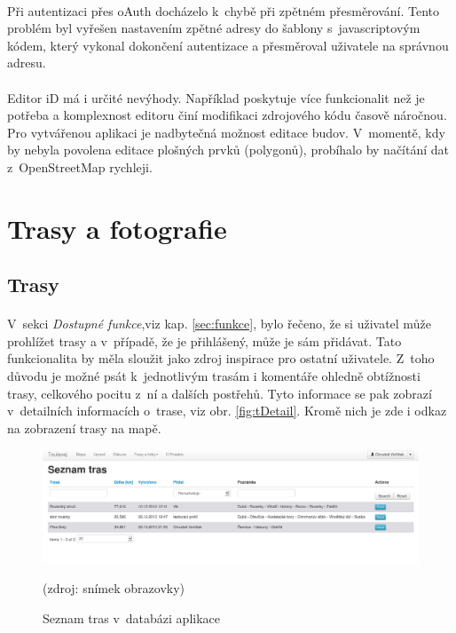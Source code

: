 \documentclass[11pt,a4paper,titlepage,oneside]{book}
\begin{document}
				\paragraph{} Při autentizaci přes oAuth docházelo k~chybě při zpětném přesměrování. Tento problém byl vyřešen nastavením zpětné adresy do šablony s~javascriptovým kódem, který vykonal dokončení autentizace a přesměroval uživatele na správnou adresu.

				\paragraph{} Editor iD má i určité nevýhody. Například poskytuje více funkcionalit než je potřeba a komplexnost editoru činí modifikaci zdrojového kódu časově náročnou. Pro vytvářenou aplikaci je nadbytečná možnost editace budov. V~momentě, kdy by nebyla povolena editace plošných prvků (polygonů), probíhalo by načítání dat z~OpenStreetMap rychleji. 



		\section{Trasy a fotografie}
			\subsection{Trasy}
			\paragraph{} V~sekci \textit{Dostupné funkce},viz kap. \ref{sec:funkce}, bylo řečeno, že si uživatel může prohlížet trasy a v~případě, že je přihlášený, může je sám přidávat. Tato funkcionalita by měla sloužit jako zdroj inspirace pro ostatní uživatele. Z~toho důvodu je možné psát k~jednotlivým trasám i komentáře ohledně obtížnosti trasy, celkového pocitu z~ní a dalších postřehů. Tyto informace se pak zobrazí v~detailních informacích o~trase, viz obr. \ref{fig:tDetail}. Kromě nich je zde i odkaz na zobrazení trasy na mapě.
		\begin{figure}[!h]
			\begin{center}
				\includegraphics[width=12cm]{obrazky/toulavej/trackDefault.png}
				\caption{Seznam tras v~databázi aplikace }
				\label{fig:tDefault}
				(zdroj: snímek obrazovky)
			\end{center}
		\end{figure}	
\end{document}
